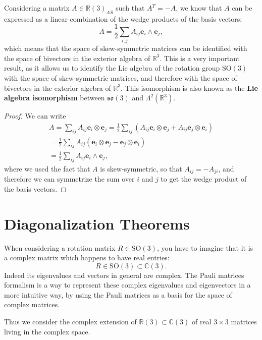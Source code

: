 Considering a matrix \(A \in \mathbb{R}(3)_{AS}\) such that \(A^T = -A\), we know that \(A\) can be expressed as a linear combination of the wedge products of the basis vectors:
\[
    A = \frac{1}{2} \sum_{i, j} A_{ij} \mathbf{e}_i \wedge \mathbf{e}_j,
\]
which means that the space of skew-symmetric matrices can be identified with the space of bivectors in the exterior algebra of \(\mathbb{R}^3\). This is a very important result, as it allows us to identify the Lie algebra of the rotation group \(\mathrm{SO}(3)\) with the space of skew-symmetric matrices, and therefore with the space of bivectors in the exterior algebra of \(\mathbb{R}^3\). This isomorphism is also known as the \textbf{Lie algebra isomorphism} between \(\mathfrak{so}(3)\) and \(\Lambda^2(\mathbb{R}^3)\).

\begin{proof}
    We can write
    \[
        \begin{aligned}
            A = \sum_{ij} A_{ij} \mathbf{e}_i \otimes \mathbf{e}_j = \frac{1}{2} \sum_{ij} (A_{ij} \mathbf{e}_i \otimes \mathbf{e}_j + A_{ij} \mathbf{e}_j \otimes \mathbf{e}_i) \\
            = \frac{1}{2} \sum_{ij} A_{ij} (\mathbf{e}_i \otimes \mathbf{e}_j - \mathbf{e}_j \otimes \mathbf{e}_i)                                                               \\
            = \frac{1}{2} \sum_{ij} A_{ij} \mathbf{e}_i \wedge \mathbf{e}_j,
        \end{aligned}
    \]
    where we used the fact that \(A\) is skew-symmetric, so that \(A_{ij} = - A_{ji}\), and therefore we can symmetrize the sum over \(i\) and \(j\) to get the wedge product of the basis vectors.
\end{proof}

\section{Diagonalization Theorems}

When considering a rotation matrix \(R \in \mathrm{SO}(3)\), you have to imagine that it is a complex matrix which happens to have real entries:
\[
    R \in \mathrm{SO}(3) \subset \mathbb{C}(3).
\]
Indeed its eigenvalues and vectors in general are complex. The Pauli matrices formalism is a way to represent these complex eigenvalues and eigenvectors in a more intuitive way, by using the Pauli matrices as a basis for the space of complex matrices.

Thus we consider the complex extension of \(\mathbb{R}(3) \subset \mathbb{C}(3)\) of real \(3 \times 3\) matrices living in the complex space.

